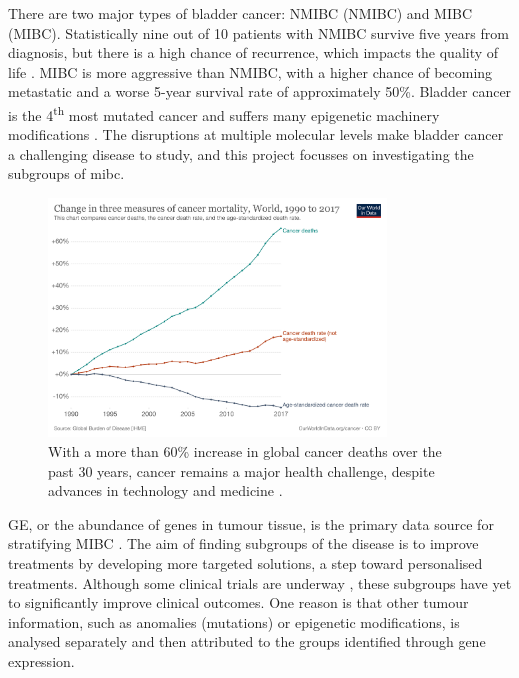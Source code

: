 There are two major types of bladder cancer: \gls{NMIBC} (NMIBC) and \gls{MIBC} (MIBC). Statistically nine out of 10 patients with NMIBC survive five years from diagnosis, but there is a high chance of recurrence, which impacts the quality of life \citep{Knowles2015-mu}. MIBC is more aggressive than NMIBC, with a higher chance of becoming metastatic and a worse 5-year survival rate of approximately 50\%. Bladder cancer is the 4\textsuperscript{th} most mutated cancer and suffers many epigenetic machinery modifications \citep{Alexandrov2013-gi}. The disruptions at multiple molecular levels make bladder cancer a challenging disease to study, and this project focusses on investigating the subgroups of \acrlong{mibc}.



\begin{figure}[!t]
    \centering
    \includegraphics[width=0.8\textwidth,keepaspectratio]{Images/cancer-deaths-rate-and-age-standardized-rate-index.png}
    \caption[Cancer mortality]{With a more than 60\% increase in global cancer deaths over the past 30 years, cancer remains a major health challenge, despite advances in technology and medicine \citep{Roser2015-qb}.}
    \label{fig:cancer_death}
\end{figure}

\gls{GE}, or the abundance of genes in tumour tissue, is the primary data source for stratifying MIBC \citep{Kamoun2020-tj,Robertson2017-mg,Marzouka2018-ge}. The aim of finding subgroups of the disease is to improve treatments by developing more targeted solutions, a step toward personalised treatments. Although some clinical trials are underway \citep{Griffin2024-zr}, these subgroups have yet to significantly improve clinical outcomes. One reason is that other tumour information, such as anomalies (mutations) or epigenetic modifications, is analysed separately and then attributed to the groups identified through gene expression.

